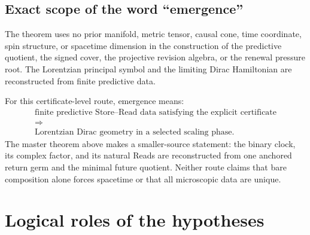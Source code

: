 \documentclass[11pt]{article}
\theoremstyle{definition}
\theoremstyle{remark}
\begin{document}
\subsection{Exact scope of the word ``emergence''}

The theorem uses no prior manifold, metric tensor, causal cone, time coordinate,
spin structure, or spacetime dimension in the construction of the predictive
quotient, the signed cover, the projective revision algebra, or the renewal
pressure root.  The Lorentzian principal symbol and the limiting Dirac
Hamiltonian are reconstructed from finite predictive data.

For this certificate-level route, emergence means:
\[
\boxed{
\begin{gathered}
\text{finite predictive Store--Read data satisfying the explicit certificate}\\
\Longrightarrow\\
\text{Lorentzian Dirac geometry in a selected scaling phase.}
\end{gathered}}
\]
The master theorem above makes a smaller-source statement: the binary clock,
its complex factor, and its natural Reads are reconstructed from one anchored
return germ and the minimal future quotient.  Neither route claims that bare
composition alone forces spacetime or that all microscopic data are unique.

\section{Logical roles of the hypotheses}
\end{document}
